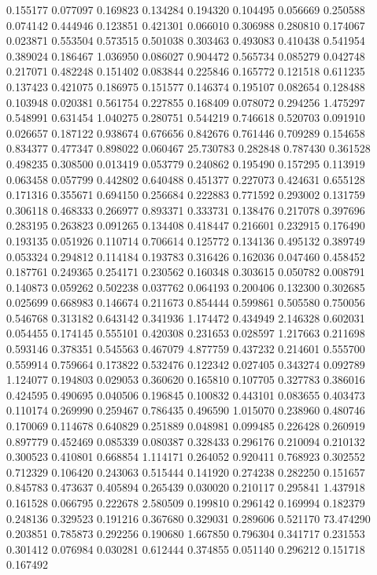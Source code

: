 0.155177
0.077097
0.169823
0.134284
0.194320
0.104495
0.056669
0.250588
0.074142
0.444946
0.123851
0.421301
0.066010
0.306988
0.280810
0.174067
0.023871
0.553504
0.573515
0.501038
0.303463
0.493083
0.410438
0.541954
0.389024
0.186467
1.036950
0.086027
0.904472
0.565734
0.085279
0.042748
0.217071
0.482248
0.151402
0.083844
0.225846
0.165772
0.121518
0.611235
0.137423
0.421075
0.186975
0.151577
0.146374
0.195107
0.082654
0.128488
0.103948
0.020381
0.561754
0.227855
0.168409
0.078072
0.294256
1.475297
0.548991
0.631454
1.040275
0.280751
0.544219
0.746618
0.520703
0.091910
0.026657
0.187122
0.938674
0.676656
0.842676
0.761446
0.709289
0.154658
0.834377
0.477347
0.898022
0.060467
25.730783
0.282848
0.787430
0.361528
0.498235
0.308500
0.013419
0.053779
0.240862
0.195490
0.157295
0.113919
0.063458
0.057799
0.442802
0.640488
0.451377
0.227073
0.424631
0.655128
0.171316
0.355671
0.694150
0.256684
0.222883
0.771592
0.293002
0.131759
0.306118
0.468333
0.266977
0.893371
0.333731
0.138476
0.217078
0.397696
0.283195
0.263823
0.091265
0.134408
0.418447
0.216601
0.232915
0.176490
0.193135
0.051926
0.110714
0.706614
0.125772
0.134136
0.495132
0.389749
0.053324
0.294812
0.114184
0.193783
0.316426
0.162036
0.047460
0.458452
0.187761
0.249365
0.254171
0.230562
0.160348
0.303615
0.050782
0.008791
0.140873
0.059262
0.502238
0.037762
0.064193
0.200406
0.132300
0.302685
0.025699
0.668983
0.146674
0.211673
0.854444
0.599861
0.505580
0.750056
0.546768
0.313182
0.643142
0.341936
1.174472
0.434949
2.146328
0.602031
0.054455
0.174145
0.555101
0.420308
0.231653
0.028597
1.217663
0.211698
0.593146
0.378351
0.545563
0.467079
4.877759
0.437232
0.214601
0.555700
0.559914
0.759664
0.173822
0.532476
0.122342
0.027405
0.343274
0.092789
1.124077
0.194803
0.029053
0.360620
0.165810
0.107705
0.327783
0.386016
0.424595
0.490695
0.040506
0.196845
0.100832
0.443101
0.083655
0.403473
0.110174
0.269990
0.259467
0.786435
0.496590
1.015070
0.238960
0.480746
0.170069
0.114678
0.640829
0.251889
0.048981
0.099485
0.226428
0.260919
0.897779
0.452469
0.085339
0.080387
0.328433
0.296176
0.210094
0.210132
0.300523
0.410801
0.668854
1.114171
0.264052
0.920411
0.768923
0.302552
0.712329
0.106420
0.243063
0.515444
0.141920
0.274238
0.282250
0.151657
0.845783
0.473637
0.405894
0.265439
0.030020
0.210117
0.295841
1.437918
0.161528
0.066795
0.222678
2.580509
0.199810
0.296142
0.169994
0.182379
0.248136
0.329523
0.191216
0.367680
0.329031
0.289606
0.521170
73.474290
0.203851
0.785873
0.292256
0.190680
1.667850
0.796304
0.341717
0.231553
0.301412
0.076984
0.030281
0.612444
0.374855
0.051140
0.296212
0.151718
0.167492
